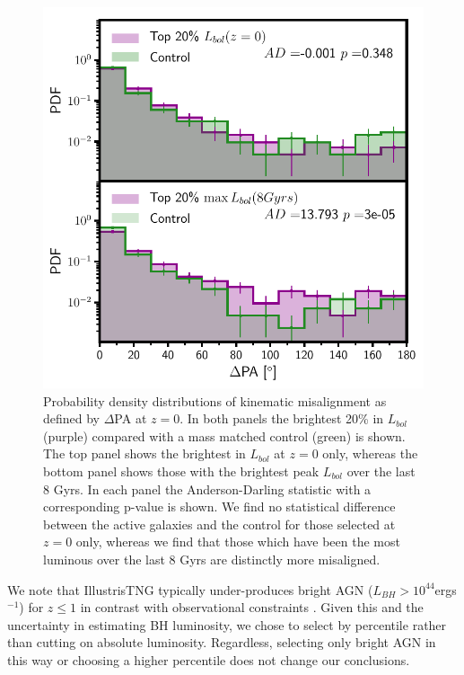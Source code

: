 \documentclass[fleqn,usenatbib]{mnras}
\begin{document}
\begin{figure}
	\includegraphics[width=\linewidth]{overall_population/PA_distribution_low_mass_z0_max_comparison.pdf}
    \caption{Probability density distributions of kinematic misalignment as defined by $\Delta$PA at $z=0$. In both panels the brightest 20\% in $L_{bol}$ (purple) compared with a mass matched control (green) is shown. The top panel shows the brightest in $L_{bol}$ at $z=0$ only, whereas the bottom panel shows those with the brightest peak $L_{bol}$ over the last 8 Gyrs. In each panel the Anderson-Darling statistic with a corresponding p-value is shown. We find no statistical difference between the active galaxies and the control for those selected at $z=0$ only, whereas we find that those which have been the most luminous over the last 8 Gyrs are distinctly more misaligned.}
    \label{fig:PAdist}
\end{figure}

We note that IllustrisTNG typically under-produces bright AGN ($L_{BH} > 10^{44}$ergs$^{-1}$) for $z \leq 1$ in contrast with observational constraints \citep[see][]{habouzit2019}. Given this and the uncertainty in estimating BH luminosity, we chose to select by percentile rather than cutting on absolute luminosity. Regardless, selecting only bright AGN in this way or choosing a higher percentile does not change our conclusions.
\end{document}
